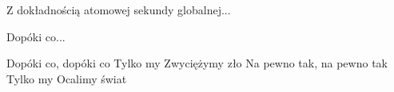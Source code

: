 \documentclass[../../../songbook.tex]{subfiles}
\begin{document}
Z dokładnością atomowej sekundy globalnej... \newline

\-\hspace{1cm} Dopóki co... \newline

\-\hspace{1cm} Dopóki co, dopóki co \newline
\-\hspace{1cm} Tylko my \newline
\-\hspace{1cm} Zwyciężymy zło \newline
\-\hspace{1cm} Na pewno tak, na pewno tak \newline
\-\hspace{1cm} Tylko my \newline
\-\hspace{1cm} Ocalimy świat  \newline
\end{document}
